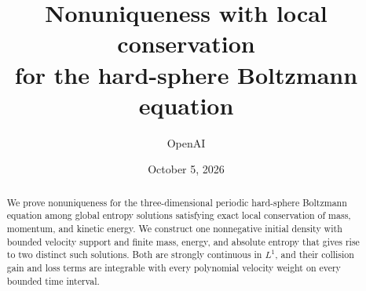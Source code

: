 \documentclass[11pt]{article}
\title{Nonuniqueness with local conservation\\
for the hard-sphere Boltzmann equation}
\author{OpenAI}
\date{October 5, 2026}
\begin{document}
\maketitle
\begin{abstract}
We prove nonuniqueness for the three-dimensional periodic hard-sphere
Boltzmann equation among global entropy solutions satisfying exact local
conservation of mass, momentum, and kinetic energy. We construct one
nonnegative initial density with bounded velocity support and finite mass,
energy, and absolute entropy that gives rise to two distinct such solutions.
Both are strongly continuous in \(L^1\), and their collision gain and loss
terms are integrable with every polynomial velocity weight on every bounded
time interval.
\end{abstract}
\tableofcontents














\end{document}
